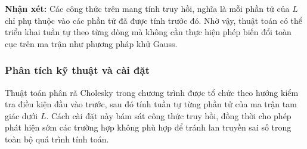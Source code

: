 \documentclass[12pt,a4paper]{article}
\begin{document}
\noindent\textbf{Nhận xét:}  
Các công thức trên mang tính truy hồi, nghĩa là mỗi phần tử của $L$ chỉ phụ thuộc vào các phần tử đã được tính trước đó. Nhờ vậy, thuật toán có thể triển khai tuần tự theo từng dòng mà không cần thực hiện phép biến đổi toàn cục trên ma trận như phương pháp khử Gauss.


\subsubsection{Phân tích kỹ thuật và cài đặt}

Thuật toán phân rã Cholesky trong chương trình được tổ chức theo hướng kiểm tra điều kiện đầu vào trước, sau đó tính tuần tự từng phần tử của ma trận tam giác dưới $L$. Cách cài đặt này bám sát công thức truy hồi, đồng thời cho phép phát hiện sớm các trường hợp không phù hợp để tránh lan truyền sai số trong toàn bộ quá trình tính toán.
\end{document}
